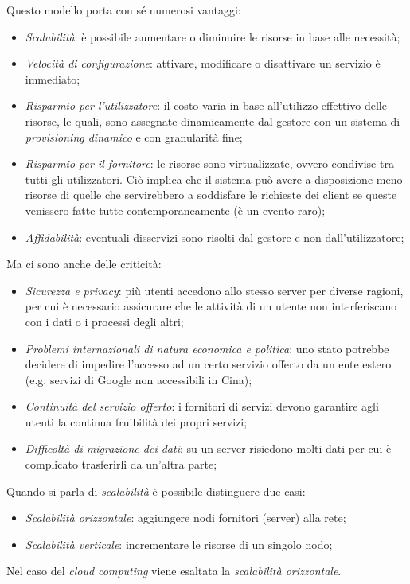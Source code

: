 Questo modello porta con sé numerosi vantaggi:
\begin{itemize}
    \item \emph{Scalabilità}: è possibile aumentare o diminuire le risorse in
    base alle necessità;
    \item \emph{Velocità di configurazione}: attivare, modificare o
    disattivare un servizio è immediato;
    \item \emph{Risparmio per l'utilizzatore}: il costo varia in base all’utilizzo
    effettivo delle risorse, le quali, sono assegnate dinamicamente dal gestore
    con un sistema di \emph{provisioning dinamico} e con granularità fine;
    \item \emph{Risparmio per il fornitore}: le risorse sono virtualizzate,
    ovvero condivise tra tutti gli utilizzatori. Ciò implica che il sistema può
    avere a disposizione meno risorse di quelle che servirebbero a soddisfare le
    richieste dei client se queste venissero fatte tutte contemporaneamente (è un
    evento raro);
    \item \emph{Affidabilità}: eventuali disservizi sono risolti dal gestore e
    non dall'utilizzatore;
\end{itemize}
Ma ci sono anche delle criticità:
\begin{itemize}
    \item \emph{Sicurezza e privacy}: più utenti accedono allo stesso server per
    diverse ragioni, per cui è necessario assicurare che le attività di un utente
    non interferiscano con i dati o i processi degli altri;
    \item \emph{Problemi internazionali di natura economica e politica}: uno stato
    potrebbe decidere di impedire l'accesso ad un certo servizio offerto da un
    ente estero (e.g. servizi di Google non accessibili in Cina);
    \item \emph{Continuità del servizio offerto}: i fornitori di servizi devono
    garantire agli utenti la continua fruibilità dei propri servizi;
    \item \emph{Difficoltà di migrazione dei dati}: su un server risiedono molti
    dati per cui è complicato trasferirli da un'altra parte;
\end{itemize}
\begin{note}
    Quando si parla di \emph{scalabilità} è possibile distinguere due casi:
    \begin{itemize}
        \item \emph{Scalabilità orizzontale}: aggiungere nodi fornitori (server)
        alla rete;
        \item \emph{Scalabilità verticale}: incrementare le risorse di un singolo
        nodo;
    \end{itemize}
    Nel caso del \emph{cloud computing} viene esaltata la \emph{scalabilità
    orizzontale}.
\end{note}

